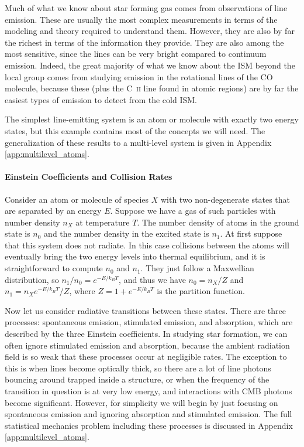 Much of what we know about star forming gas comes from observations of line emission. These are usually the most complex measurements in terms of the modeling and theory required to understand them. However, they are also by far the richest in terms of the information they provide. They are also among the most sensitive, since the lines can be very bright compared to continuum emission. Indeed, the great majority of what we know about the ISM beyond the local group comes from studying emission in the rotational lines of the CO molecule, because these (plus the C~\textsc{ii} line found in atomic regions) are by far the easiest types of emission to detect from the cold ISM.

The simplest line-emitting system is an atom or molecule with exactly two energy states, but this example contains most of the concepts we will need. The generalization of these results to a multi-level system is given in Appendix \ref{app:multilevel_atoms}.

\paragraph{Einstein Coefficients and Collision Rates}

Consider an atom or molecule of species $X$ with two non-degenerate states that are separated by an energy $E$. Suppose we have a gas of such particles with number density $n_X$ at temperature $T$. The number density of atoms in the ground state is $n_0$ and the number density in the excited state is $n_1$. At first suppose that this system does not radiate. In this case collisions between the atoms will eventually bring the two energy levels into thermal equilibrium, and it is straightforward to compute $n_0$ and $n_1$. They just follow a Maxwellian distribution, so $n_1/n_0 = e^{-E/k_B T}$, and thus we have $n_0 = n_X /Z$ and $n_1 = n_X e^{-E/k_B T}/Z$, where $Z=1+e^{-E/k_B T}$ is the partition function.

Now let us consider radiative transitions between these states. There are three processes: spontaneous emission, stimulated emission, and absorption, which are described by the three Einstein coefficients. In studying star formation, we can often ignore stimulated emission and absorption, because the ambient radiation field is so weak that these processes occur at negligible rates. The exception to this is when lines become optically thick, so there are a lot of line photons bouncing around trapped inside a structure, or when the frequency of the transition in question is at very low energy, and interactions with CMB photons become significant. However, for simplicity we will begin by just focusing on spontaneous emission and ignoring absorption and stimulated emission. The full statistical mechanics problem including these processes is discussed in Appendix \ref{app:multilevel_atoms}.

